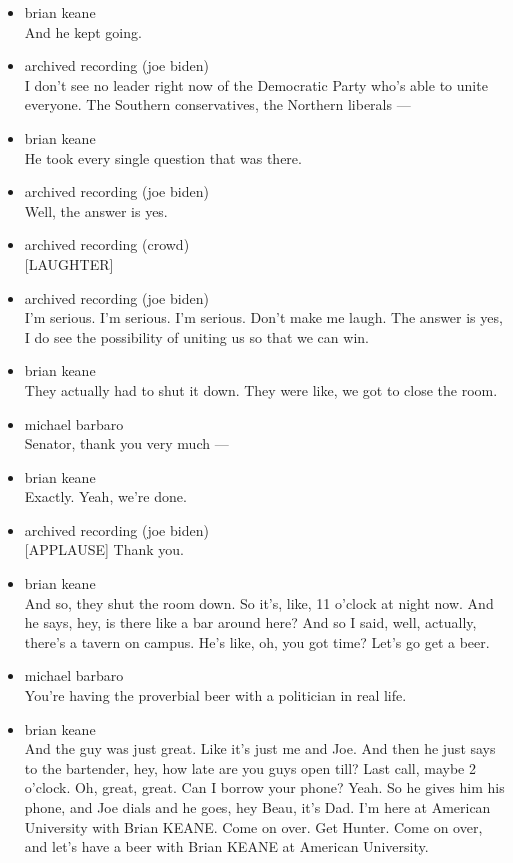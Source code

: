 \begin{itemize}
\item
  brian keane\\
  And he kept going.
\item
  archived recording (joe biden)\\
  I don't see no leader right now of the Democratic Party who's able to
  unite everyone. The Southern conservatives, the Northern liberals ---
\item
  brian keane\\
  He took every single question that was there.
\item
  archived recording (joe biden)\\
  Well, the answer is yes.
\item
  archived recording (crowd)\\
  {[}LAUGHTER{]}
\item
  archived recording (joe biden)\\
  I'm serious. I'm serious. I'm serious. Don't make me laugh. The answer
  is yes, I do see the possibility of uniting us so that we can win.
\item
  brian keane\\
  They actually had to shut it down. They were like, we got to close the
  room.
\item
  michael barbaro\\
  Senator, thank you very much ---
\item
  brian keane\\
  Exactly. Yeah, we're done.
\item
  archived recording (joe biden)\\
  {[}APPLAUSE{]} Thank you.
\item
  brian keane\\
  And so, they shut the room down. So it's, like, 11 o'clock at night
  now. And he says, hey, is there like a bar around here? And so I said,
  well, actually, there's a tavern on campus. He's like, oh, you got
  time? Let's go get a beer.
\item
  michael barbaro\\
  You're having the proverbial beer with a politician in real life.
\item
  brian keane\\
  And the guy was just great. Like it's just me and Joe. And then he
  just says to the bartender, hey, how late are you guys open till? Last
  call, maybe 2 o'clock. Oh, great, great. Can I borrow your phone?
  Yeah. So he gives him his phone, and Joe dials and he goes, hey Beau,
  it's Dad. I'm here at American University with Brian KEANE. Come on
  over. Get Hunter. Come on over, and let's have a beer with Brian KEANE
  at American University.
\end{itemize}

